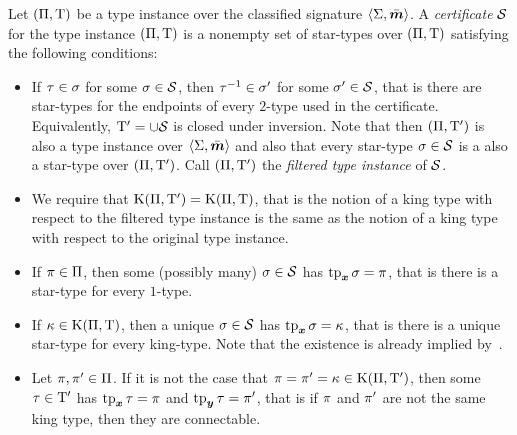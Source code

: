 \begin{definition}
Let $(\Pi,\mathrm{T})$ be a type instance over the classified signature
$\left\langle \mathrm{\Sigma},\bar{\bm{m}} \right\rangle$.
A \emph{certificate} $\mathcal{S}$ for the type instance
$(\Pi,\mathrm{T})$ is a nonempty set of star-types over $(\Pi,\mathrm{T})$
satisfying the following conditions:
\begin{itemize}
  \item[\condcerti]\label{cond:certi}
  If $\tau\in\sigma$ for some $\sigma\in\mathcal{S}$, then $\tau^{-1}\in\sigma'$ for
  some $\sigma'\in\mathcal{S}$, that is there are star-types for the endpoints of every
  $2$-type used in the certificate. Equivalently, ${\mathrm{T}'} = \cup\mathcal{S}$ is closed
  under inversion. Note that then $(\Pi,{\mathrm{T}'})$ is also a type instance over
  $\left\langle \mathrm{\Sigma},\bar{\bm{m}} \right\rangle$ and also that every star-type $\sigma \in \mathcal{S}$ is a also a
  star-type over $(\Pi,{\mathrm{T}'})$. Call $(\Pi,{\mathrm{T}'})$ the \emph{filtered
  type instance} of $\mathcal{S}$.
  \item[\condcertK]\label{cond:certK}
  We require that $\mathrm{K}(\Pi,{\mathrm{T}'}) = \mathrm{K}(\Pi,\mathrm{T})$, that is the notion of a
  king type with respect to the filtered type instance is the same as the notion
  of a king type with respect to the original type instance.
  \item[\condcertp]\label{cond:certp}
  If $\pi \in \Pi$, then some (possibly many) $\sigma \in \mathcal{S}$ has
  $\operatorname{tp}_{\bm{x}}\sigma = \pi$, that is there is a star-type for every $1$-type.
  \item[\condcertk]\label{cond:certk}
  If $\kappa \in \mathrm{K}(\Pi,\mathrm{T})$, then a unique $\sigma \in \mathcal{S}$ has
  $\operatorname{tp}_{\bm{x}}\sigma = \kappa$, that is there is a unique star-type for every king-type.
  Note that the existence is already implied by~.
  \item[\condcertc]\label{cond:certc}
  Let $\pi, {\pi'} \in \Pi$. If it is not the case that $\pi =
  {\pi'} = \kappa \in \mathrm{K}(\Pi,{\mathrm{T}'})$, then some $\tau \in {\mathrm{T}'}$ has
  $\operatorname{tp}_{\bm{x}}\tau = \pi$ and $\operatorname{tp}_{\bm{y}}\tau = {\pi'}$, that is if $\pi$ and ${\pi'}$
  are not the same king type, then they are connectable.
\end{itemize}
\end{definition}

